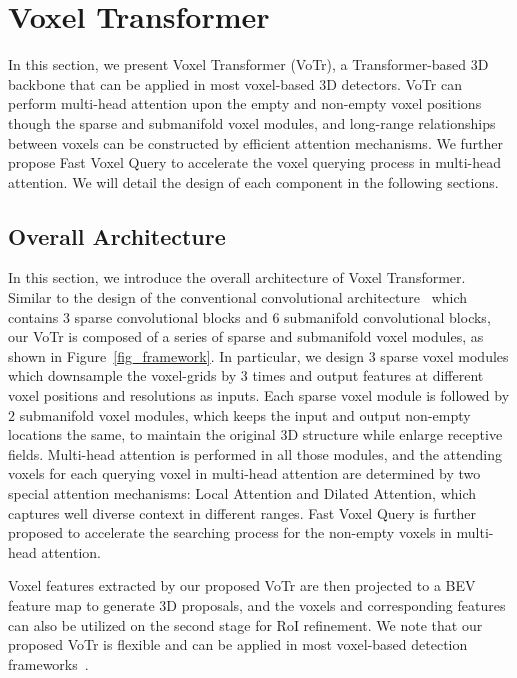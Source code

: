 \documentclass[10pt,twocolumn,letterpaper]{article}
\begin{document}
\section{Voxel Transformer}
In this section, we present Voxel Transformer (VoTr), a Transformer-based 3D backbone that can be applied in most voxel-based 3D detectors. VoTr can perform multi-head attention upon the empty and non-empty voxel positions though the sparse and submanifold voxel modules, and long-range relationships between voxels can be constructed by efficient attention mechanisms. We further propose Fast Voxel Query to accelerate the voxel querying process in multi-head attention. We will detail the design of each component in the following sections.   

\subsection{Overall Architecture}
In this section, we introduce the overall architecture of Voxel Transformer. Similar to the design of the conventional convolutional architecture~\cite{yan2018second} which contains $3$ sparse convolutional blocks and $6$ submanifold convolutional blocks, our VoTr is composed of a series of sparse and submanifold voxel modules, as shown in Figure~\ref{fig_framework}. In particular, we design $3$ sparse voxel modules which downsample the voxel-grids by $3$ times and output features at different voxel positions and resolutions as inputs. Each sparse voxel module is followed by $2$ submanifold voxel modules, which keeps the input and output non-empty locations the same, to maintain the original 3D structure while enlarge receptive fields. Multi-head attention is performed in all those modules, and the attending voxels for each querying voxel in multi-head attention are determined by two special attention mechanisms: Local Attention and Dilated Attention, which captures well diverse context in different ranges. Fast Voxel Query is further proposed to accelerate the searching process for the non-empty voxels in multi-head attention. 

Voxel features extracted by our proposed VoTr are then projected to a BEV feature map to generate 3D proposals, and the voxels and corresponding features can also be utilized on the second stage for RoI refinement. We note that our proposed VoTr is flexible and can be applied in most voxel-based detection frameworks~\cite{yan2018second, shi2020pv, deng2020voxel}.
\end{document}
